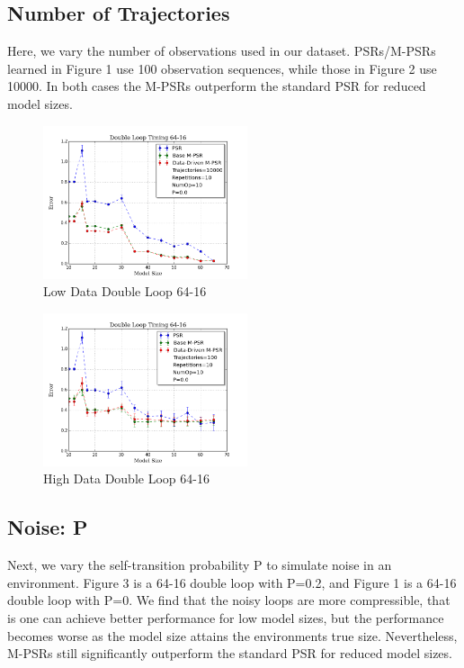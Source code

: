 \subsection{Number of Trajectories}

Here, we vary the number of observations used in our dataset. PSRs/M-PSRs learned in Figure 1 use 100 observation sequences, while those in Figure 2 use 10000. In both cases the M-PSRs outperform the standard PSR for reduced model sizes.

\begin{figure}[ht!]
\centering
\includegraphics[width=60mm]{uCOREPICS/DL/64-16-10000.png}
\caption{Low Data Double Loop 64-16\label{overflow}}
\end{figure}

\begin{figure}[ht!]
\centering
\includegraphics[width=60mm]{uCOREPICS/DL/64-16-100.png}
\caption{High Data Double Loop 64-16\label{overflow}}
\end{figure}

\subsection{Noise: P}

Next, we vary the self-transition probability P to simulate noise in an environment. Figure 3 is a 64-16 double loop with P=0.2, and Figure 1 is a 64-16 double loop with P=0. We find that the noisy loops are more compressible, that is one can achieve better performance for low model sizes, but the performance becomes worse as the model size attains the environments true size. Nevertheless, M-PSRs still significantly outperform the standard PSR for reduced model sizes.

